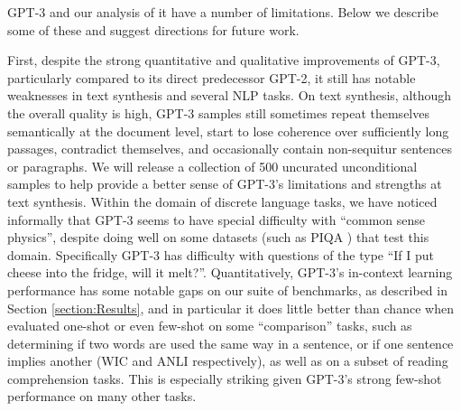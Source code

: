 GPT-3 and our analysis of it have a number of limitations.  Below we describe some of these and suggest directions for future work.

First, despite the strong quantitative and qualitative improvements of GPT-3, particularly compared to its direct predecessor GPT-2, it still has notable weaknesses in text synthesis and several NLP tasks.  On text synthesis, although the overall quality is high, GPT-3 samples still sometimes repeat themselves semantically at the document level, start to lose coherence over sufficiently long passages, contradict themselves, and occasionally contain non-sequitur sentences or paragraphs.  We will release a collection of 500 uncurated unconditional samples to help provide a better sense of GPT-3’s limitations and strengths at text synthesis. Within the domain of discrete language tasks, we have noticed informally that GPT-3 seems to have special difficulty with ``common sense physics'', despite doing well on some datasets (such as PIQA \cite{bisk2019piqa}) that test this domain.  Specifically GPT-3 has difficulty with questions of the type ``If I put cheese into the fridge, will it melt?''.  Quantitatively, GPT-3’s in-context learning performance has some notable gaps on our suite of benchmarks, as described in Section \ref{section:Results}, and in particular it does little better than chance when evaluated one-shot or even few-shot on some ``comparison'' tasks, such as determining if two words are used the same way in a sentence, or if one sentence implies another (WIC and ANLI respectively), as well as on a subset of reading comprehension tasks.  This is especially striking given GPT-3’s strong few-shot performance on many other tasks.

